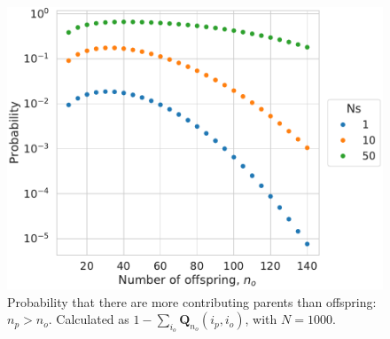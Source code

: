 \documentclass[review]{elsarticle}
\begin{document}

\begin{figure}[H]
  \centering
  \includegraphics[width=\textwidth]{fig/missing.pdf}
  \caption{Probability that there are more contributing parents than offspring: $n_p > n_o$.
    Calculated as $1-\sum_{i_o} \mathbf{Q}_{n_o}{(i_p, i_o)}$, with $N=1000$.}
  \label{fig_apx_missing}
\end{figure}


\end{document}
